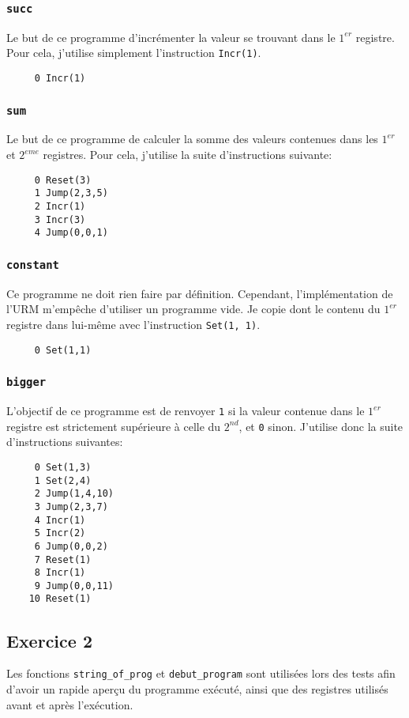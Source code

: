 \documentclass[11pt, a4paper, twoside, titlepage]{article}
\begin{document}
\subsubsection{\texttt{succ}}
Le but de ce programme d'incrémenter la valeur se trouvant dans le $1^{er}$ registre. Pour cela, j'utilise simplement l'instruction \texttt{Incr(1)}.
\begin{lstlisting}
	 0 Incr(1)
\end{lstlisting}

\subsubsection{\texttt{sum}}
Le but de ce programme de calculer la somme des valeurs contenues dans les $1^{er}$ et $2^{eme}$ registres. Pour cela, j'utilise la suite d'instructions suivante:
\begin{lstlisting}
	 0 Reset(3)
	 1 Jump(2,3,5)
	 2 Incr(1)
	 3 Incr(3)
	 4 Jump(0,0,1)
\end{lstlisting}

\subsubsection{\texttt{constant}}
Ce programme ne doit rien faire par définition. Cependant, l'implémentation de l'URM m'empêche d'utiliser un programme vide. Je copie dont le contenu du $1^{er}$ registre dans lui-même avec l'instruction \texttt{Set(1, 1)}.
\begin{lstlisting}
 	 0 Set(1,1)
\end{lstlisting}

\subsubsection{\texttt{bigger}}
L'objectif de ce programme est de renvoyer \texttt{1} si la valeur contenue dans le $1^{er}$ registre est strictement supérieure à celle du $2^{nd}$, et \texttt{0} sinon. J'utilise donc la suite d'instructions suivantes:
\begin{lstlisting}
	 0 Set(1,3)
	 1 Set(2,4)
	 2 Jump(1,4,10)
	 3 Jump(2,3,7)
	 4 Incr(1)
	 5 Incr(2)
	 6 Jump(0,0,2)
	 7 Reset(1)
	 8 Incr(1)
	 9 Jump(0,0,11)
	10 Reset(1)
\end{lstlisting}

\subsection{Exercice 2}
Les fonctions \texttt{string\_of\_prog} et \texttt{debut\_program} sont utilisées lors des tests afin d'avoir un rapide aperçu du programme exécuté, ainsi que des registres utilisés avant et après l'exécution.
\end{document}
